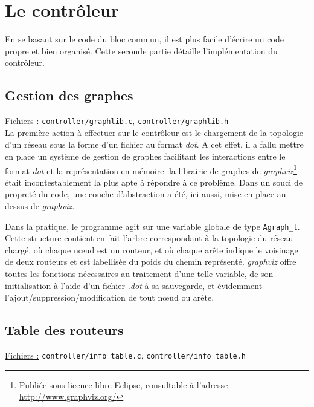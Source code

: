 \documentclass[a4paper,11pt]{article}
\begin{document}
\section{Le contrôleur}

En se basant sur le code du bloc commun, il est plus facile d'écrire un code propre et bien organisé. Cette seconde partie détaille l'implémentation du contrôleur.

\subsection{Gestion des graphes}

\underline{Fichiers :} \texttt{controller/graphlib.c}, \texttt{controller/graphlib.h}\\

La première action à effectuer sur le contrôleur est le chargement de la topologie d'un réseau sous la forme d'un fichier au format \textit{dot}. A cet effet, il a fallu mettre en place un système de gestion de graphes facilitant les interactions entre le format \textit{dot} et la représentation en mémoire: la librairie de graphes de \textit{graphviz}\footnote{Publiée sous licence libre Eclipse, consultable à l'adresse \url{http://www.graphviz.org/}} était incontestablement la plus apte à répondre à ce problème. Dans un souci de propreté du code, une couche d'abstraction a été, ici aussi, mise en place au dessus de \textit{graphviz}.

Dans la pratique, le programme agit sur une variable globale de type \texttt{Agraph\_t}. Cette structure contient en fait l'arbre correspondant à la topologie du réseau chargé, où chaque n\oe ud est un routeur, et où chaque arête indique le voisinage de deux routeurs et est labellisée du poids du chemin représenté. \textit{graphviz} offre toutes les fonctions nécessaires au traitement d'une telle variable, de son initialisation à l'aide d'un fichier \textit{.dot} à sa sauvegarde, et évidemment l'ajout/suppression/modification de tout n\oe ud ou arête.

\subsection{Table des routeurs}

\underline{Fichiers :} \texttt{controller/info\_table.c}, \texttt{controller/info\_table.h}\\
\end{document}
